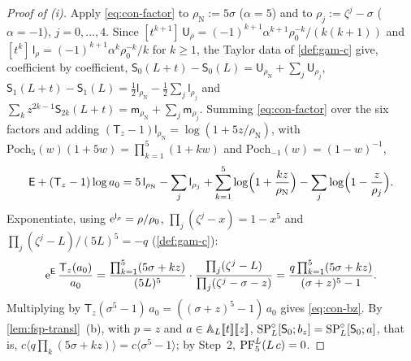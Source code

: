 \begin{proof}[Proof of (i)]
Apply \eqref{eq:con-factor} to $\rho_{\mathrm N}:=5\sigma$ ($\alpha=5$) and to $\rho_j:=\zeta^j-\sigma$ ($\alpha=-1$), $j=0,\dots,4$. Since $[t^{k+1}]\,\mathsf U_\rho=(-1)^{k+1}\alpha^{k+1}\rho_0^{-k}/(k(k+1))$ and $[t^k]\,\mathsf l_\rho=(-1)^{k+1}\alpha^k\rho_0^{-k}/k$ for $k\geq1$, the Taylor data of \cref{def:gam-c} give, coefficient by coefficient, $\mathsf S_0(L+t)-\mathsf S_0(L)=\mathsf U_{\rho_{\mathrm N}}+\sum_j\mathsf U_{\rho_j}$, $\mathsf S_1(L+t)-\mathsf S_1(L)=\frac12\mathsf l_{\rho_{\mathrm N}}-\frac12\sum_j\mathsf l_{\rho_j}$ and $\sum_kz^{2k-1}\mathsf S_{2k}(L+t)=\mathsf m_{\rho_{\mathrm N}}+\sum_j\mathsf m_{\rho_j}$. Summing \eqref{eq:con-factor} over the six factors and adding $(\mathsf T_z-1)\mathsf l_{\rho_{\mathrm N}}=\log(1+5z/\rho_{\mathrm N})$, with $\mathrm{Poch}_5(w)(1+5w)=\prod_{k=1}^5(1+kw)$ and $\mathrm{Poch}_{-1}(w)=(1-w)^{-1}$,
\[
\mathsf E+(\mathsf T_z-1)\log a_0=5\,\mathsf l_{\rho_{\mathrm N}}-\sum_j\mathsf l_{\rho_j}+\sum_{k=1}^5\log\Bigl(1+\frac{kz}{\rho_{\mathrm N}}\Bigr)-\sum_j\log\Bigl(1-\frac z{\rho_j}\Bigr).
\]
Exponentiate, using $\mathrm{e}^{\mathsf l_\rho}=\rho/\rho_0$, $\prod_j(\zeta^j-x)=1-x^5$ and $\prod_j(\zeta^j-L)/(5L)^5=-q$ (\cref{def:gam-c}):
\[
\mathrm{e}^{\mathsf E}\,\frac{\mathsf T_z(a_0)}{a_0}=\frac{\prod_{k=1}^5(5\sigma+kz)}{(5L)^5}\cdot\frac{\prod_j(\zeta^j-L)}{\prod_j(\zeta^j-\sigma-z)}=\frac{q\prod_{k=1}^5(5\sigma+kz)}{(\sigma+z)^5-1}.
\]
Multiplying by $\mathsf T_z(\sigma^5-1)\,a_0=((\sigma+z)^5-1)\,a_0$ gives \eqref{eq:con-bz}. By \cref{lem:fsp-transl}~(b), with $p=z$ and $a\in\mathbb{A}_{L}[\![ t ]\!][\![ z ]\!]$, $\mathrm{SP}^{\circ}_L[\mathsf S_0;b_z]=\mathrm{SP}^{\circ}_L[\mathsf S_0;a]$, that is, $c\langle q\prod_k(5\sigma+kz)\rangle=c\langle\sigma^5-1\rangle$; by Step~2, $\mathrm{PF}_{5}^{L}(L\,c)=0$.
\end{proof}



